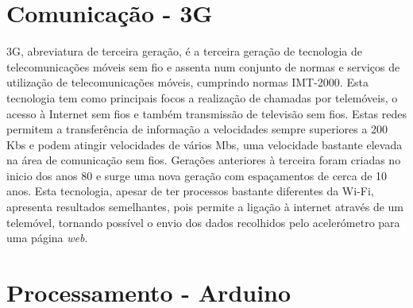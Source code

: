 \section{Comunicação - 3G}
\label{sec:3g}

3G, abreviatura de terceira geração, é a terceira geração de tecnologia de telecomunicações móveis sem fio e assenta num conjunto de normas e serviços de utilização de telecomunicações móveis, cumprindo normas IMT-2000.
Esta tecnologia tem como principais focos a realização de chamadas por telemóveis, o acesso à Internet sem fios e também transmissão de televisão sem fios.
Estas redes permitem a transferência de informação a velocidades sempre superiores a 200 Kbs e podem atingir velocidades de vários Mbs, uma velocidade bastante elevada na área de comunicação sem fios.
Gerações anteriores à terceira foram criadas no inicio dos anos 80 e surge uma nova geração com espaçamentos de cerca de 10 anos.
Esta tecnologia, apesar de ter processos bastante diferentes da Wi-Fi, apresenta resultados semelhantes, pois permite a ligação à internet através de um telemóvel, tornando possível o envio dos dados recolhidos pelo acelerómetro para uma página \emph{web}.

\section{Processamento - Arduino}
\label{sec:arduino}


